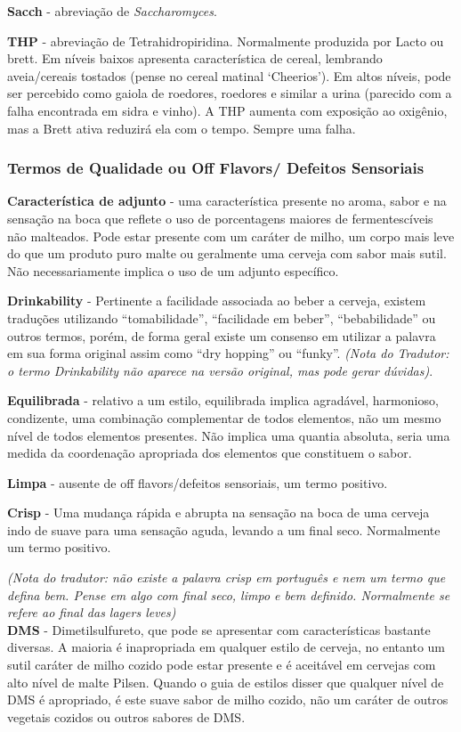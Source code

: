 \textbf{Sacch} - abreviação de \textit{Saccharomyces}.

\textbf{THP} - abreviação de Tetrahidropiridina. Normalmente produzida por Lacto ou brett. Em níveis baixos apresenta característica de cereal, lembrando aveia/cereais tostados (pense no cereal matinal ‘Cheerios’). Em altos níveis, pode ser percebido como gaiola de roedores, roedores e similar a urina (parecido com a falha encontrada em sidra e vinho). A THP aumenta com exposição ao oxigênio, mas a Brett ativa reduzirá ela com o tempo. Sempre uma falha.
\subsubsection*{Termos de Qualidade ou Off Flavors/ Defeitos Sensoriais}
\textbf{Característica de adjunto} - uma característica presente no aroma, sabor e na sensação na boca que reflete o uso de porcentagens maiores de fermentescíveis não malteados. Pode estar presente com um caráter de milho, um corpo mais leve do que um produto puro malte ou geralmente uma cerveja com sabor mais sutil. Não necessariamente implica o uso de um adjunto específico.

\textbf{Drinkability} - Pertinente a facilidade associada ao beber a cerveja, existem traduções utilizando “tomabilidade”, “facilidade em beber”, “bebabilidade” ou outros termos, porém, de forma geral existe um consenso em utilizar a palavra em sua forma original assim como “dry hopping” ou “funky”. \textit{(Nota do Tradutor: o termo Drinkability não aparece na versão original, mas pode gerar dúvidas)}.

\textbf{Equilibrada} - relativo a um estilo, equilibrada implica agradável, harmonioso, condizente, uma combinação complementar de todos elementos, não um mesmo nível de todos elementos presentes. Não implica uma quantia absoluta, seria uma medida da coordenação apropriada dos elementos que constituem o sabor.

\textbf{Limpa} - ausente de off flavors/defeitos sensoriais, um termo positivo.

\textbf{Crisp} - Uma mudança rápida e abrupta na sensação na boca de uma cerveja indo de suave para uma sensação aguda, levando a um final seco. Normalmente um termo positivo.

\textit{(Nota do tradutor: não existe a palavra crisp em português e nem um termo que defina bem. Pense em algo com final seco, limpo e bem definido. Normalmente se refere ao final das lagers leves)}\\
\textbf{DMS} - Dimetilsulfureto, que pode se apresentar com características bastante diversas. A maioria é inapropriada em qualquer estilo de cerveja, no entanto um sutil caráter de milho cozido pode estar presente e é aceitável em cervejas com alto nível de malte Pilsen. Quando o guia de estilos disser que qualquer nível de DMS é apropriado, é este suave sabor de milho cozido, não um caráter de outros vegetais cozidos ou outros sabores de DMS.

